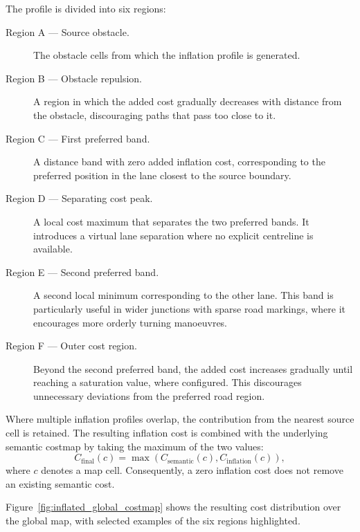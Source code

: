 \documentclass[a4paper,11pt,oneside]{book}
\begin{document}
The profile is divided into six regions:

\begin{description}
    \item[Region A --- Source obstacle.]
    The obstacle cells from which the inflation profile
    is generated.

    \item[Region B --- Obstacle repulsion.]
    A region in which the added cost gradually decreases
    with distance from the obstacle, discouraging paths
    that pass too close to it.

    \item[Region C --- First preferred band.]
    A distance band with zero added inflation cost,
    corresponding to the preferred position in the lane
    closest to the source boundary.

    \item[Region D --- Separating cost peak.]
    A local cost maximum that separates the two preferred
    bands. It introduces a virtual lane separation where
    no explicit centreline is available.

    \item[Region E --- Second preferred band.]
    A second local minimum corresponding to the other lane.
    This band is particularly useful in wider junctions
    with sparse road markings, where it encourages more
    orderly turning manoeuvres.

    \item[Region F --- Outer cost region.]
    Beyond the second preferred band, the added cost
    increases gradually until reaching a saturation value,
    where configured. This discourages unnecessary
    deviations from the preferred road region.
\end{description}

Where multiple inflation profiles overlap, the contribution from the nearest source cell is retained. The resulting inflation cost is
combined with the underlying semantic costmap by taking
the maximum of the two values:
\begin{equation}
    C_{\mathrm{final}}(c)
    =
    \max\left(
        C_{\mathrm{semantic}}(c),
        C_{\mathrm{inflation}}(c)
    \right),
    \label{eq:inflation_cost_combination}
\end{equation}
where $c$ denotes a map cell. Consequently, a zero inflation
cost does not remove an existing semantic cost.

Figure~\ref{fig:inflated_global_costmap} shows the resulting
cost distribution over the global map, with selected examples
of the six regions highlighted.
\end{document}
